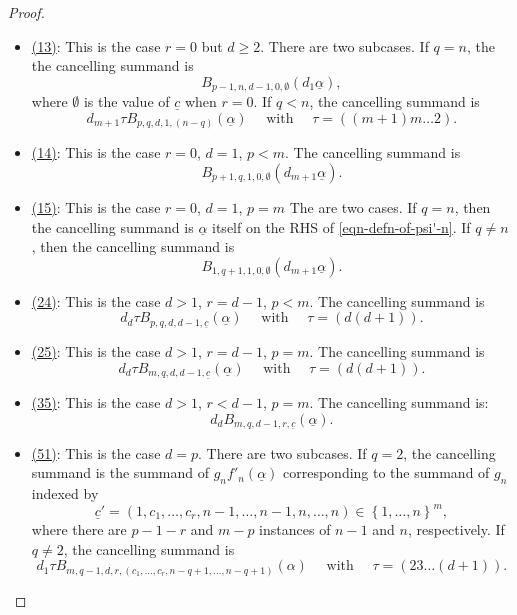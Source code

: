 \documentclass[12pt,a4paper,reqno]{amsart}
\begin{document}
\begin{proof}
\begin{itemize}
\item \underline{(13)}: This is the case $r = 0$ but $d \geq 2$. 
There are two subcases. If $q = n$, the the cancelling summand is  
$$B_{p-1, n, d-1, 0,\emptyset}(d_1 \underline{\alpha}),$$
where $\emptyset$ is the value of $\underline{c}$ when $r=0$. 
If $q < n$, the cancelling summand is
$$
d_{m+1} \tau B_{p, q, d, 1, (n-q)}(\underline{\alpha})
\quad \text{ with } \quad \tau = \left((m+1)m\dots2\right).$$

\item \underline{(14)}: This is the case $r = 0$, $d = 1$, $p < m$. The
cancelling summand is 
$$ B_{p+1, q, 1, 0, \emptyset}(d_{m+1}\underline{\alpha}). $$

\item \underline{(15)}: This is the case $r = 0$, $d = 1$, $p = m$ 
The are two cases. If $q = n$, then the cancelling summand is 
$\underline{\alpha}$ itself on the RHS of \eqref{eqn-defn-of-psi'-n}. 
If $q \neq n$, then the cancelling summand is
$$ B_{1, q+1, 1, 0, \emptyset}(d_{m+1}\underline{\alpha}). $$

\item \underline{(24)}: This is the case $d > 1$, $r = d-1$, $p < m$.
The cancelling summand is 
$$ d_d \tau B_{p, q, d, d-1, \underline{c}} (\underline{\alpha})
\quad \text{ with } \quad 
\tau = \left(d(d+1)\right).$$

\item \underline{(25)}: This is the case $d > 1$, $r = d-1$, $p = m$. 
The cancelling summand is 
$$ d_{d} \tau B_{m, q, d, d-1, \underline{c}} (\underline{\alpha})
\quad \text{ with } \quad 
\tau = \left(d(d+1)\right).$$

\item \underline{(35)}: This is the case $d > 1$, $r < d-1$, $p = m$.
The cancelling summand is:
$$ d_{d} B_{m,q,d-1,r,\underline{c}}(\underline{\alpha}). $$

\item \underline{(51)}: This is the case $d=p$. There are two
subcases. If $q = 2$, the cancelling summand is 
the summand of $g_n f'_n(\underline{\alpha})$ corresponding
to the summand of $g_n$ indexed by 
\begin{equation}
\label{eqn-indexing-c-for-the-summand-of-gf'}
\underline{c}' = (1,c_1, \dots, c_r,n-1, \dots, n-1, n, \dots, n) \in 
\left\{ 1, \dots, n\right\}^m,
\end{equation}
where there are $p-1-r$ and $m-p$ instances of $n-1$ and $n$,
respectively. If $q \neq 2$, the cancelling summand is
$$ d_{1} \tau B_{m,q-1,d,r,(c_1, \dots, c_r, n-q+1, \dots, n-q+1)}(\alpha)
\quad \text{ with } \quad \tau = (23\dots(d+1)).$$
\end{itemize}


\end{proof}
\end{document}
